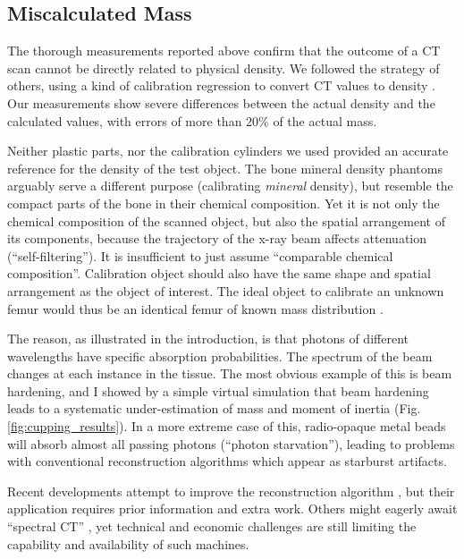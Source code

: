 \subsection{Miscalculated Mass}
\label{sec:org737d0a4}
The thorough measurements reported above confirm that the outcome of a CT scan cannot be directly related to physical density.
We followed the strategy of others, using a kind of calibration regression to convert CT values to density \citep{Mull1984,Phillips1997,DuPlessis2013,Durston2022,Fath2023}.
Our measurements show severe differences between the actual density and the calculated values, with errors of more than \(20\%\) of the actual mass.


Neither plastic parts, nor the calibration cylinders we used provided an accurate reference for the density of the test object.
The bone mineral density phantoms arguably serve a different purpose (calibrating \emph{mineral} density), but resemble the compact parts of the bone in their chemical composition.
Yet it is not only the chemical composition of the scanned object, but also the spatial arrangement of its components, because the trajectory of the x-ray beam affects attenuation (``self-filtering'').
It is insufficient to just assume ``comparable chemical composition''.
Calibration object should also have the same shape and spatial arrangement as the object of interest.
The ideal object to calibrate an unknown femur would thus be an identical femur of known mass distribution \citep[which is actually attempted in clinical tomography, cf.][]{Lennie2021}.


The reason, as illustrated in the introduction, is that photons of different wavelengths have specific absorption probabilities.
The spectrum of the beam changes at each instance in the tissue.
The most obvious example of this is beam hardening, and I showed by a simple virtual simulation that beam hardening leads to a systematic under-estimation of mass and moment of inertia (Fig. \ref{fig:cupping_results}).
In a more extreme case of this, radio-opaque metal beads will absorb almost all passing photons (``photon starvation''), leading to problems with conventional reconstruction algorithms which appear as starburst artifacts.


Recent developments attempt to improve the reconstruction algorithm \citep{Six2019,Frenkel2022,Yang2021,Batenburg2011}, but their application requires prior information and extra work.
Others might eagerly await ``spectral CT'' \citep{Liu2023}, yet technical and economic challenges are still limiting the capability and availability of such machines.


